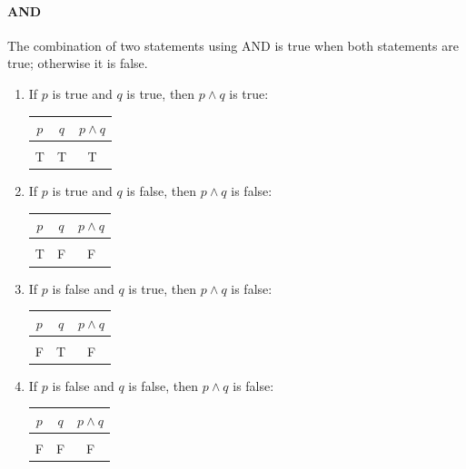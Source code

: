 \paragraph{AND} The combination of two statements using AND is true when both statements are true; otherwise it is false.
\begin{enumerate}
\item If $p$ is true and $q$ is true, then $p \wedge q$ is true:
\begin{center}
\begin{tabular}{c c c}
$p$ & $q$ & $p \wedge q$\\
\hline
& & \\
T & T & T
\end{tabular}
\end{center}
\item If $p$ is true and $q$ is false, then $p \wedge q$ is false:
\begin{center}
\begin{tabular}{c c c}
$p$ & $q$ & $p \wedge q$\\
\hline
& & \\
T & F & F
\end{tabular}
\end{center}
\item If $p$ is false and $q$ is true, then $p \wedge q$ is false:
\begin{center}
\begin{tabular}{c c c}
$p$ & $q$ & $p \wedge q$\\
\hline
& & \\
F & T & F
\end{tabular}
\end{center}
\item If $p$ is false and $q$ is false, then $p \wedge q$ is false:
\begin{center}
\begin{tabular}{c c c}
$p$ & $q$ & $p \wedge q$\\
\hline
& & \\
F & F & F
\end{tabular}
\end{center}
\end{enumerate}

